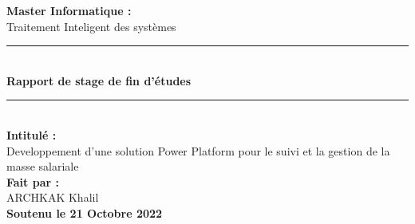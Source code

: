 \documentclass[11pt,french]{report}
\begin{document}
\setcounter{secnumdepth}{3}

\begin{titlepage}

\begin{center}

\par
{}
\hfill{}
\par
\vspace*{1.3cm}

\linespread{1.3}\huge {\bfseries Master Informatique :}\\\Huge{Traitement Inteligent des systèmes}

\rule{\textwidth}{2pt}\\[0.2cm]
\huge{\bfseries Rapport de stage de fin d'études}
\rule{\textwidth}{2pt}\\[0.2cm]

\linespread{1.5}\huge {\bfseries Intitulé :}\\
Developpement d’une solution Power Platform pour le suivi et la gestion de la masse salariale\\[0.3cm]


\linespread{1.3}\huge {\bfseries Fait par :}\\{\huge ARCHKAK Khalil}\\[0.5cm]

\noindent \Large{\textbf{Soutenu le 21 Octobre 2022}}  \\[0.3cm]



\end{center}
\end{titlepage}
\end{document}

